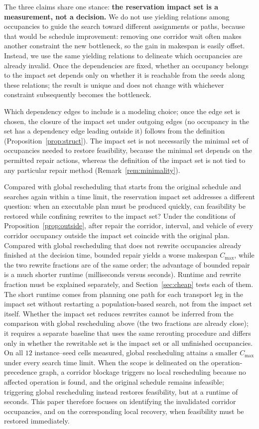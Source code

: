 \documentclass[manuscript,screen,review]{acmart}
\newcommand{\EfiveCells}{12}        %
\begin{document}
The three claims share one stance: \textbf{the reservation impact set is a measurement, not a decision.}
We do not use yielding relations among occupancies to guide the search toward different assignments or paths, because that would be schedule improvement:
removing one corridor wait often makes another constraint the new bottleneck, so the gain in makespan is easily offset.
Instead, we use the same yielding relations to delineate which occupancies are already invalid. Once the dependencies are fixed,
whether an occupancy belongs to the impact set depends only on whether it is reachable from the seeds along these relations; the result is unique
and does not change with whichever constraint subsequently becomes the bottleneck.

Which dependency edges to include is a modeling choice; once the edge set is chosen, the closure of the impact set under outgoing edges (no occupancy in the set has a dependency edge leading outside it)
follows from the definition (Proposition~\ref{prop:struct}).
The impact set is not necessarily the minimal set of occupancies needed to restore feasibility, because the minimal set depends on the permitted repair actions,
whereas the definition of the impact set is not tied to any particular repair method (Remark~\ref{rem:minimality}).

Compared with global rescheduling that starts from the original schedule and searches again within a time limit, the reservation impact set addresses a different question:
when an executable plan must be produced quickly, can feasibility be restored while confining rewrites to the impact set?
Under the conditions of Proposition~\ref{prop:outside}, after repair the corridor, interval, and vehicle of every corridor occupancy outside the impact set coincide with the original plan.
Compared with global rescheduling that does not rewrite occupancies already finished at the decision time, bounded repair yields a worse makespan \(C_{\max}\),
while the two rewrite fractions are of the same order; the advantage of bounded repair is a much shorter runtime (milliseconds versus seconds).
Runtime and rewrite fraction must be explained separately, and Section~\ref{sec:cheap} tests each of them.
The short runtime comes from planning one path for each transport leg in the impact set without restarting a population-based search, not from the impact set itself.
Whether the impact set reduces rewrites cannot be inferred from the comparison with global rescheduling above (the two fractions are already close);
it requires a separate baseline that uses the same rerouting procedure and differs only in whether the rewritable set is the impact set or all unfinished occupancies.
On all \(\EfiveCells\) instance--seed cells measured, global rescheduling attains a smaller \(C_{\max}\) under every search time limit.
When the scope is delineated on the operation-precedence graph, a corridor blockage triggers no local rescheduling because no affected operation is found, and the original schedule remains infeasible;
triggering global rescheduling instead restores feasibility, but at a runtime of seconds.
This paper therefore focuses on identifying the invalidated corridor occupancies, and on the corresponding local recovery, when feasibility must be restored immediately.
\end{document}
